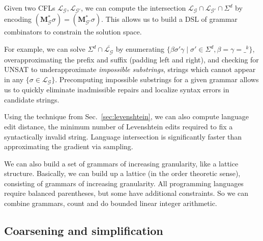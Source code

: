 \documentclass[sigplan,review,anonymous,acmsmall]{acmart}\settopmatter{printfolios=false,printccs=false,printacmref=false}
\begin{document}
Given two CFLs $\mathcal{L}_\mathcal{G}, \mathcal{L}_{\mathcal{G}'}$, we can compute the intersection $\mathcal{L}_\mathcal{G}\cap\mathcal{L}_{\mathcal{G}'}\cap\Sigma^d$ by encoding $(\mathbf{M}_\mathcal{G}^*\sigma) = (\mathbf{M}_{\mathcal{G}'}^*\sigma)$. This allows us to build a DSL of grammar combinators to constrain the solution space.

For example, we can solve $\Sigma^d \cap \overline{\mathcal{L}_\mathcal{G}}$ by enumerating $\{\beta\sigma'\gamma \mid \sigma' \in \Sigma^d, \beta = \gamma = \_^k\}$, overapproximating the prefix and suffix (padding left and right), and checking for UNSAT to underapproximate \textit{impossible substrings}, strings which cannot appear in any $\{\sigma \in \mathcal{L}_\mathcal{G}\}$. Precomputing impossible substrings for a given grammar allows us to quickly eliminate inadmissible repairs and localize syntax errors in candidate strings.

Using the technique from Sec.~\ref{sec:levenshtein}, we can also compute language edit distance, the minimum number of Levenshtein edits required to fix a syntactically invalid string. Language intersection is significantly faster than approximating the gradient via sampling.

We can also build a set of grammars of increasing granularity, like a lattice structure. Basically, we can build up a lattice (in the order theoretic sense), consisting of grammars of increasing granularity. All programming languages require balanced parentheses, but some have additional constraints. So we can combine grammars, count and do bounded linear integer arithmetic.

\subsection{Coarsening and simplification}

\newcommand\ddd{\Ddots}
\newcommand\vdd{\Vdots}
\newcommand\cdd{\Cdots}
\newcommand\lds{\ldots}
\newcommand\vno{\varnothing}
\newcommand{\ts}[1]{\textsuperscript{#1}}
\newcommand\non{1\ts{st}}
\newcommand\ntw{2\ts{nd}}
\newcommand\nth{3\ts{rd}}
\newcommand\nfo{4\ts{th}}
\newcommand\nfi{5\ts{th}}
\newcommand\nsi{6\ts{th}}
\newcommand\nse{7\ts{th}}
\newcommand{\vs}[1]{\sigma_{#1}^{\shur}}
\newcommand{\gs}[1]{\gamma_{#1}^{\shur}}
\newcommand{\bs}[1]{\beta_{#1}^{\shur}}
\newcommand{\qs}[1]{\alpha_{#1}^{\shur}}
\newcommand\rcr{\rowcolor{black!15}}
\newcommand\rcw{\rowcolor{white}}
\newcommand\pcd{\cdot}
\newcommand\pcp{\phantom\cdot}
\newcommand\ppp{\phantom{\nse}}
\newcommand\hhg[1]{\tikz[overlay]\node[rectangle,fill=black!15,draw=none,text opacity =1] {$#1$};}
\end{document}

